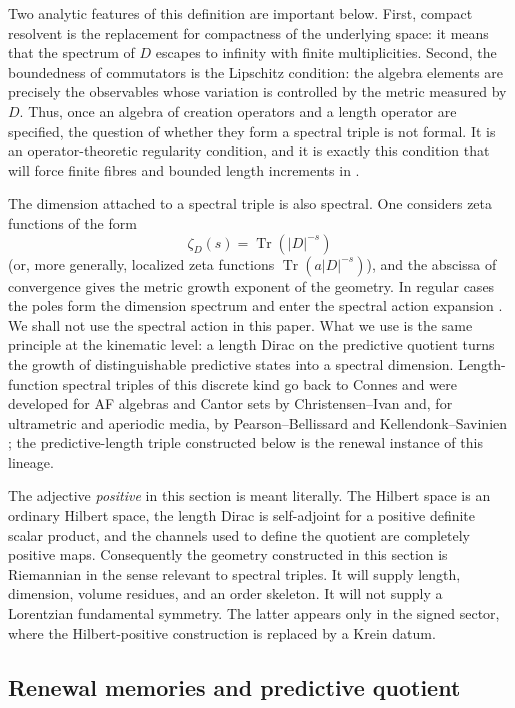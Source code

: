 \documentclass[11pt]{article}
\theoremstyle{definition}
\theoremstyle{remark}
\newcommand{\Tr}{\operatorname{Tr}}
\begin{document}
Two analytic features of this definition are important below.  First, compact
resolvent is the replacement for compactness of the underlying space: it means
that the spectrum of $D$ escapes to infinity with finite multiplicities.  Second,
the boundedness of commutators is the Lipschitz condition: the algebra elements
are precisely the observables whose variation is controlled by the metric
measured by $D$.  Thus, once an algebra of creation operators and a length
operator are specified, the question of whether they form a spectral triple is
not formal.  It is an operator-theoretic regularity condition, and it is exactly
this condition that will force finite fibres and bounded length increments in
.

The dimension attached to a spectral triple is also spectral.  One considers
zeta functions of the form
\[
   \zeta_D(s)=\Tr(|D|^{-s})
\]
(or, more generally, localized zeta functions $\Tr(a|D|^{-s})$), and the
abscissa of convergence gives the metric growth exponent of the geometry.  In
regular cases the poles form the dimension spectrum and enter the spectral
action expansion \cite{chamseddineconnes1997}.  We shall not use the spectral
action in this paper.  What we use is the same principle at the kinematic level:
a length Dirac on the predictive quotient turns the growth of distinguishable
predictive states into a spectral dimension.  Length-function spectral triples of
this discrete kind go back to Connes \cite{connes1989} and were developed for AF
algebras and Cantor sets by Christensen--Ivan \cite{christensenivan2006} and, for
ultrametric and aperiodic media, by Pearson--Bellissard \cite{pearson-bellissard}
and Kellendonk--Savinien \cite{kellendonksavinien2012}; the predictive-length
triple constructed below is the renewal instance of this lineage.

The adjective \emph{positive} in this section is meant literally.  The Hilbert
space is an ordinary Hilbert space, the length Dirac is self-adjoint for a
positive definite scalar product, and the channels used to define the quotient
are completely positive maps.  Consequently the geometry constructed in this
section is Riemannian in the sense relevant to spectral triples.  It will supply
length, dimension, volume residues, and an order skeleton.  It will not supply a
Lorentzian fundamental symmetry.  The latter appears only in the signed sector,
where the Hilbert-positive construction is replaced by a Krein datum.

\subsection{Renewal memories and predictive quotient}
\label{subsec:renewal-collapse}
\end{document}
